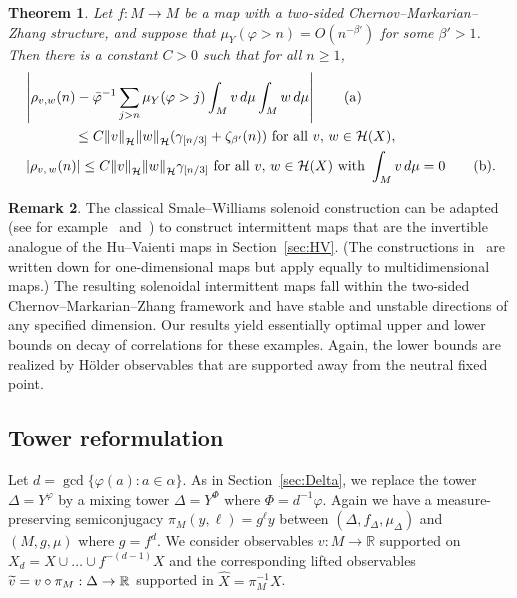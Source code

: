 \documentclass[10pt]{amsart}
\newtheorem{theo}{Theorem}[section]
\theoremstyle{definition}\newtheorem{defi}[theo]{Definition}\newtheorem{rema}[theo]{Remark}\newtheorem{exam}[theo]{Example}\newtheorem{exem}[theo]{Example}\newtheorem{nota}[theo]{Notation}
\newcommand{\R}{\mathbb{R}}
\newcommand{\cH}{\mathcal{H}}
\newcommand{\hX}{\widehat{X}}
\newcommand{\tv}{\tilde{v}}
\newcommand{\bvarphi}{\bar{\varphi}}
\newcommand*{\alphenumi}{\renewcommand*{\theenumi}{\alph{enumi}}}
\let\oldtilde\tilde
\renewcommand*{\tilde}[1]{\mathchoice{\widetilde{#1}}{\widetilde{#1}}{\oldtilde{#1}}{\oldtilde{#1}}}
\begin{document}
\begin{theo} \label{thm:main2}
Let $f:M\to M$ be a map with a two-sided Chernov--Marka\-rian--Zhang structure, and suppose that $\mu_Y(\varphi>n)=O(n^{-\beta'})$ for some $\beta'>1$. Then there is a constant $C>0$ such that for all $n\ge1$,
\begin{align}
&\left|\rho_{v,w}(n)-\bvarphi^{-1}\sum_{j>n} \mu_Y(\varphi>j)\int_Mv\,d\mu\int_Mw\,d\mu\right|\tag{${\rm a}$}\label{theo7.4.1}\\
&\mkern65mu\le C{\|v\|}_{\cH}{\|w\|}_{\cH}(\gamma_{[n/3]}+\zeta_{\beta'}(n))\text{ for all }v,\,w\in \cH(X),\nonumber\\
&\left|\rho_{v,\,w}(n)\right|\le C{\|v\|}_{\cH}{\|w\|}_\cH\gamma_{[n/3]}\text{ for all }v,\,w\in \cH(X)\text{ with }\int_M v\,d\mu=0\tag{${\rm b}$}\label{theo7.4.2}.
\end{align}
\end{theo}


\begin{rema}\label{rmk:NUH}
The classical Smale--Williams solenoid construction can be adap\-ted (see for example~\cite[Section~5]{AlvesPinheiro08} and~\cite[Example~4.2]{MV16}) to construct intermittent maps that are the invertible analogue of the Hu--Vaienti maps in Section~\ref{sec:HV}. (The constructions in~\cite{AlvesPinheiro08,MV16} are written down for one-dimensional maps but apply equally to multidimensional maps.) The resulting solenoidal intermittent maps fall within the two-sided Chernov--Markarian--Zhang framework and have stable and unstable directions of any specified dimension. Our results yield essentially optimal upper and lower bounds on decay of correlations for these examples. Again, the lower bounds are realized by H\"older observables that are supported away from the neutral fixed point.
\end{rema}


\subsection{Tower reformulation}\label{sec:Delta2}
Let $d=\gcd\{\varphi(a):a\in\alpha\}$. As in Section~\ref{sec:Delta}, we replace the tower $\Delta=Y^\varphi$ by a mixing tower $\Delta=Y^\Phi$ where $\Phi=d^{-1}\varphi$. Again we have a measure-preserving semiconjugacy $\pi_M(y,\ell)=g^\ell y$ between $(\Delta,f_\Delta,\mu_\Delta)$ and $(M,g,\mu)$ where $g=f^d$. We consider observables $v:M\to\R$ supported on $X_d=X\cup\dots\cup f^{-(d-1)}X$ and the corresponding lifted observables $\tv=v\circ\pi_M:\Delta\to\R$ supported in $\hX=\pi_M^{-1}X$.
\end{document}
